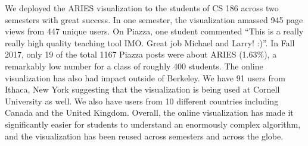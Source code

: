 \documentclass[12pt]{article}
\begin{document}
We deployed the ARIES visualization to the students of CS 186 across two
semesters with great success. In one semester, the visualization amassed 945
page views from 447 unique users. On Piazza, one student commented ``This is a
really really high quality teaching tool IMO. Great job Michael and Larry!
:)''. In Fall 2017, only 19 of the total 1167 Piazza posts were about ARIES
(1.63\%), a remarkably low number for a class of roughly 400 students. The
online visualization has also had impact outside of Berkeley. We have 91 users
from Ithaca, New York suggesting that the visualization is being used at
Cornell University as well. We also have users from 10 different countries
including Canada and the United Kingdom. Overall, the online visualization has
made it significantly easier for students to understand an enormously complex
algorithm, and the visualization has been reused across semesters and across
the globe.

{
  \footnotesize
  
  
}
\end{document}

